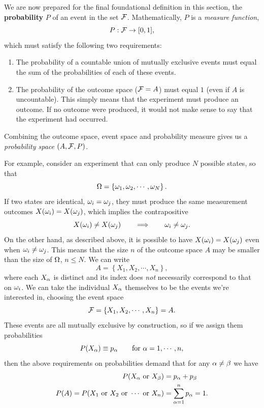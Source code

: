 We are now prepared for the final foundational definition in this section, the \textbf{probability} $P$ of an event in the set $\mathcal F$.
Mathematically, $P$ is a \textit{measure function},
\begin{equation*}
  P: \mathcal F \to [0, 1],
\end{equation*}
which must satisfy the following two requirements: \\[-24 pt]
\begin{enumerate}
  \item The probability of a countable union of mutually exclusive events must equal the sum of the probabilities of each of these events.
  \item The probability of the outcome space ($\mathcal F = A$) must equal $1$ (even if $A$ is uncountable).
        This simply means that the experiment \cE must produce an outcome.
        If no outcome were produced, it would not make sense to say that the experiment had occurred. \\[-24 pt]
\end{enumerate}
Combining the outcome space, event space and probability measure gives us a \textit{probability space} $(A, \mathcal F, P)$.

For example, consider an experiment that can only produce $N$ possible states, so that
\begin{equation*}
  \Omega = \left\{\omega_1, \omega_2, \cdots, \omega_N\right\}.
\end{equation*}
If two states are identical, $\omega_i = \omega_j$, they must produce the same measurement outcomes $X(\omega_i) = X(\omega_j)$, which implies the contrapositive
\begin{equation*}
  X(\omega_i) \ne X(\omega_j) \qquad \Longrightarrow \qquad \omega_i \ne \omega_j.
\end{equation*}
On the other hand, as described above, it is possible to have $X(\omega_i) = X(\omega_j)$ even when $\omega_i \ne \omega_j$.
This means that the size $n$ of the outcome space $A$ may be smaller than the size of $\Omega$, $n \leq N$.
We can write
\begin{equation*}
  A = \left\{X_1, X_2, \cdots, X_n\right\},
\end{equation*}
where each $X_{\alpha}$ is distinct and its index does \textit{not} necessarily correspond to that on $\omega_i$.
We can take the individual $X_{\alpha}$ themselves to be the events we're interested in, choosing the event space
\begin{equation}
  \label{eq:finite_set}
  \mathcal F = \left\{X_1, X_2, \cdots, X_n\right\} = A.
\end{equation}
These events are all mutually exclusive by construction, so if we assign them probabilities
\begin{equation*}
  P(X_{\alpha}) \equiv p_{\alpha} \qquad \mbox{for } \alpha = 1, \cdots, n,
\end{equation*}
then the above requirements on probabilities demand that for any $\alpha \ne \beta$ we have
\begin{align*}
  P(X_{\alpha} \mbox{ or } X_{\beta}) & = p_{\alpha} + p_{\beta} \\
  P(A) = P(X_1 \hbox{ or } X_2 \hbox{ or } \cdots \mbox{ or } X_n) & = \sum_{\alpha = 1}^n p_{\alpha} = 1.
\end{align*}

